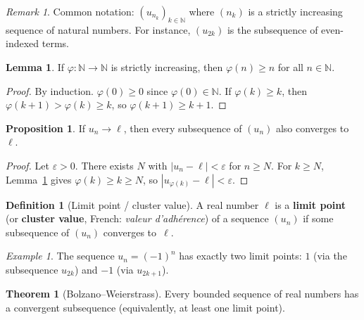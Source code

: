 \documentclass[12pt,a4paper,openany]{book}
\newcommand{\N}{\mathbb{N}}
\newcommand{\eps}{\varepsilon}
\newcommand{\abs}[1]{\left\lvert #1 \right\rvert}
\theoremstyle{definition}
\newtheorem{definition}{Definition}[chapter]
\newtheorem{theorem}{Theorem}[chapter]
\newtheorem{proposition}{Proposition}[chapter]
\newtheorem{lemma}{Lemma}[chapter]
\theoremstyle{remark}
\newtheorem{remark}{Remark}[chapter]
\newtheorem{example}{Example}[chapter]
\begin{document}
\begin{remark}
Common notation: $(u_{n_k})_{k\in\N}$ where $(n_k)$ is a strictly increasing
sequence of natural numbers. For instance, $(u_{2k})$ is the subsequence of
even-indexed terms.
\end{remark}

\begin{lemma}\label{lem:extraction-bound}
If $\varphi\colon \N \to \N$ is strictly increasing, then
$\varphi(n) \geq n$ for all $n \in \N$.
\end{lemma}

\begin{proof}
By induction. $\varphi(0) \geq 0$ since $\varphi(0) \in \N$.
If $\varphi(k) \geq k$, then
$\varphi(k+1) > \varphi(k) \geq k$, so $\varphi(k+1) \geq k + 1$.
\end{proof}

\begin{proposition}\label{prop:subsequence-limit}
If $u_n \to \ell$, then every subsequence of $(u_n)$ also converges to~$\ell$.
\end{proposition}

\begin{proof}
Let $\eps > 0$. There exists $N$ with $\abs{u_n - \ell} < \eps$ for $n \geq N$.
For $k \geq N$, Lemma~\ref{lem:extraction-bound} gives $\varphi(k) \geq k \geq N$,
so $\abs{u_{\varphi(k)} - \ell} < \eps$.
\end{proof}

\begin{definition}[Limit point / cluster value]\label{def:limit-point}
%
A real number $\ell$ is a \textbf{limit point} (or \textbf{cluster value},
French: \emph{valeur d'adh\'erence})
of a sequence $(u_n)$ if some subsequence of $(u_n)$ converges to~$\ell$.
\end{definition}

\begin{example}
The sequence $u_n = (-1)^n$ has exactly two limit points: $1$ (via the
subsequence $u_{2k}$) and $-1$ (via $u_{2k+1}$).
\end{example}

\begin{theorem}[Bolzano--Weierstrass]\label{thm:BW}
Every bounded sequence of real numbers has a convergent subsequence
(equivalently, at least one limit point).
\end{theorem}
\end{document}
